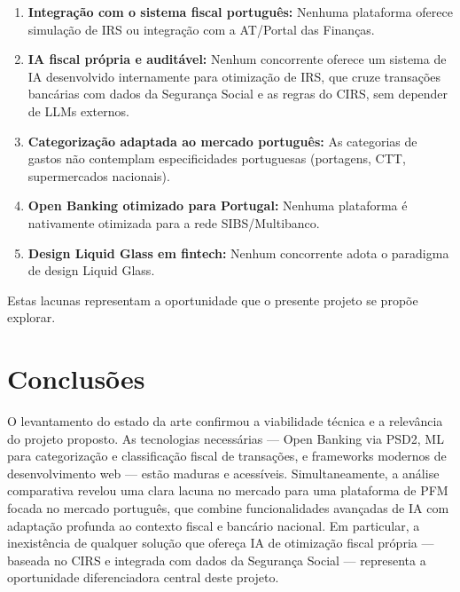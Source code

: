 \begin{enumerate}
    \item \textbf{Integração com o sistema fiscal português:} Nenhuma plataforma oferece simulação de \ac{IRS} ou integração com a \ac{AT}/Portal das Finanças.
    \item \textbf{IA fiscal própria e auditável:} Nenhum concorrente oferece um sistema de \ac{IA} desenvolvido internamente para otimização de \ac{IRS}, que cruze transações bancárias com dados da Segurança Social e as regras do \ac{CIRS}, sem depender de \ac{LLM}s externos.
    \item \textbf{Categorização adaptada ao mercado português:} As categorias de gastos não contemplam especificidades portuguesas (portagens, CTT, supermercados nacionais).
    \item \textbf{Open Banking otimizado para Portugal:} Nenhuma plataforma é nativamente otimizada para a rede \ac{SIBS}/Multibanco.
    \item \textbf{Design Liquid Glass em fintech:} Nenhum concorrente adota o paradigma de design Liquid Glass.
\end{enumerate}

Estas lacunas representam a oportunidade que o presente projeto se propõe explorar.


\section{Conclusões}
\label{sec:ea-conclusoes}

O levantamento do estado da arte confirmou a viabilidade técnica e a relevância do projeto proposto. As tecnologias necessárias --- Open Banking via \ac{PSD2}, \ac{ML} para categorização e classificação fiscal de transações, e frameworks modernos de desenvolvimento web --- estão maduras e acessíveis. Simultaneamente, a análise comparativa revelou uma clara lacuna no mercado para uma plataforma de \ac{PFM} focada no mercado português, que combine funcionalidades avançadas de \ac{IA} com adaptação profunda ao contexto fiscal e bancário nacional. Em particular, a inexistência de qualquer solução que ofereça \ac{IA} de otimização fiscal própria --- baseada no \ac{CIRS} e integrada com dados da Segurança Social --- representa a oportunidade diferenciadora central deste projeto.
